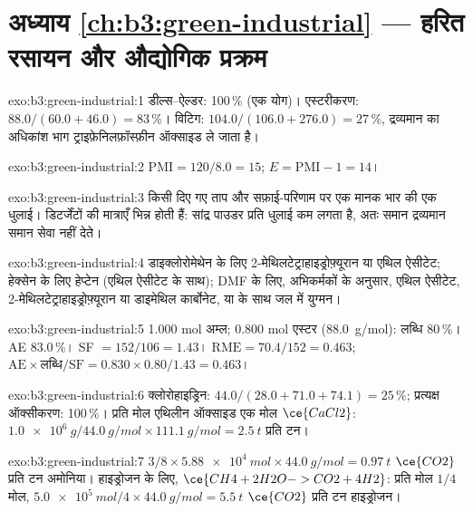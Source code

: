 \section*{अध्याय \ref{ch:b3:green-industrial} --- हरित रसायन और औद्योगिक प्रक्रम}

\begin{solution}{exo:b3:green-industrial:1}
डील्स--ऐल्डर: 100\,\% (एक योग)। एस्टरीकरण: $88.0/(60.0 + 46.0) = 83$\,\%। विटिग:
$104.0/(106.0 + 276.0) = 27$\,\%, द्रव्यमान का अधिकांश भाग ट्राइफ़ेनिलफ़ॉस्फ़ीन ऑक्साइड ले जाता है।
\end{solution}

\begin{solution}{exo:b3:green-industrial:2}
$\mathrm{PMI} = 120/8.0 = 15$; $E = \mathrm{PMI} - 1 = 14$।
\end{solution}

\begin{solution}{exo:b3:green-industrial:3}
किसी दिए गए ताप और सफ़ाई-परिणाम पर एक मानक भार की एक धुलाई। डिटर्जेंटों की
मात्राएँ भिन्न होती हैं: सांद्र पाउडर प्रति धुलाई कम लगता है, अतः समान द्रव्यमान
समान सेवा नहीं देते।
\end{solution}

\begin{solution}{exo:b3:green-industrial:4}
डाइक्लोरोमेथेन के लिए 2-मेथिलटेट्राहाइड्रोफ़्यूरान या एथिल ऐसीटेट; हेक्सेन के लिए हेप्टेन (एथिल
ऐसीटेट के साथ); DMF के लिए, अभिकर्मकों के अनुसार, एथिल ऐसीटेट, 2-मेथिलटेट्राहाइड्रोफ़्यूरान या
डाइमेथिल कार्बोनेट, या  के साथ जल में युग्मन।
\end{solution}

\begin{solution}{exo:b3:green-industrial:5}
1.000 mol अम्ल; 0.800 mol एस्टर (\qty{88.0}{g/mol}): लब्धि 80\,\%। AE 83.0\,\%। SF $= 152/106 = 1.43$।
$\mathrm{RME} = 70.4/152 = 0.463$; $\mathrm{AE} \times \text{लब्धि}/\mathrm{SF} = 0.830 \times 0.80/1.43 = 0.463$।
\end{solution}

\begin{solution}{exo:b3:green-industrial:6}
क्लोरोहाइड्रिन: $44.0/(28.0 + 71.0 + 74.1) = 25$\,\%; प्रत्यक्ष ऑक्सीकरण: 100\,\%। प्रति मोल एथिलीन ऑक्साइड
एक मोल $\ce{CaCl2}$: $\qty{1.0e6}{g}/\qty{44.0}{g/mol} \times \qty{111.1}{g/mol} = \qty{2.5}{t}$ प्रति टन।
\end{solution}

\begin{solution}{exo:b3:green-industrial:7}
$3/8 \times \qty{5.88e4}{mol} \times \qty{44.0}{g/mol} = \qty{0.97}{t}$ $\ce{CO2}$ प्रति टन अमोनिया। हाइड्रोजन के लिए, $\ce{CH4 + 2H2O -> CO2 + 4H2}$:
प्रति मोल $1/4$ मोल, $\qty{5.0e5}{mol}/4 \times \qty{44.0}{g/mol} = \qty{5.5}{t}$ $\ce{CO2}$ प्रति टन हाइड्रोजन।
\end{solution}

